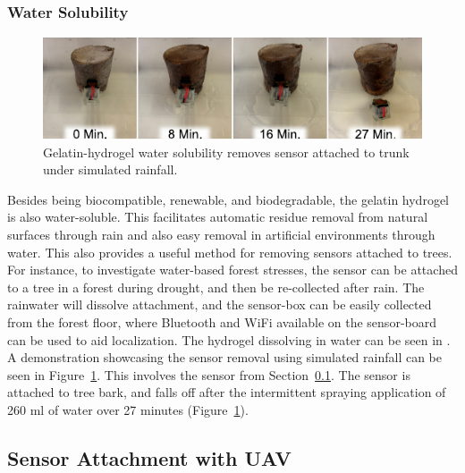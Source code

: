 \subsubsection{Water Solubility}
\begin{figure}
  \includegraphics[width=\linewidth]{chapters/papers/SB/figures/fig-water-solubility/fig-water-solubility.pdf}
  \caption{Gelatin-hydrogel water solubility removes sensor attached to trunk under simulated rainfall.}
  \label{fig:fig-water-solubility}
\end{figure}
Besides being biocompatible, renewable, and biodegradable, the gelatin hydrogel is also water-soluble. This facilitates automatic residue removal from natural surfaces through rain and also easy removal in artificial environments through water. This also provides a useful method for removing sensors attached to trees. For instance, to investigate water-based forest stresses, the sensor can be attached to a tree in a forest during drought, and then be re-collected after rain. The rainwater will dissolve attachment, and the sensor-box can be easily collected from the forest floor, where Bluetooth and WiFi available on the sensor-board can be used to aid localization. 
The hydrogel dissolving in water can be seen in \cite{Geckeler2023b}. A demonstration showcasing the sensor removal using simulated rainfall can be seen in Figure~\ref{fig:fig-water-solubility}. This involves the sensor from Section~\ref{subsec:sensor_attachment}. The sensor is attached to tree bark, and falls off after the intermittent spraying application of 260 ml of water over 27 minutes (Figure~\ref{fig:fig-water-solubility}). 




\subsection{Sensor Attachment with UAV}
\label{subsec:sensor_attachment}

